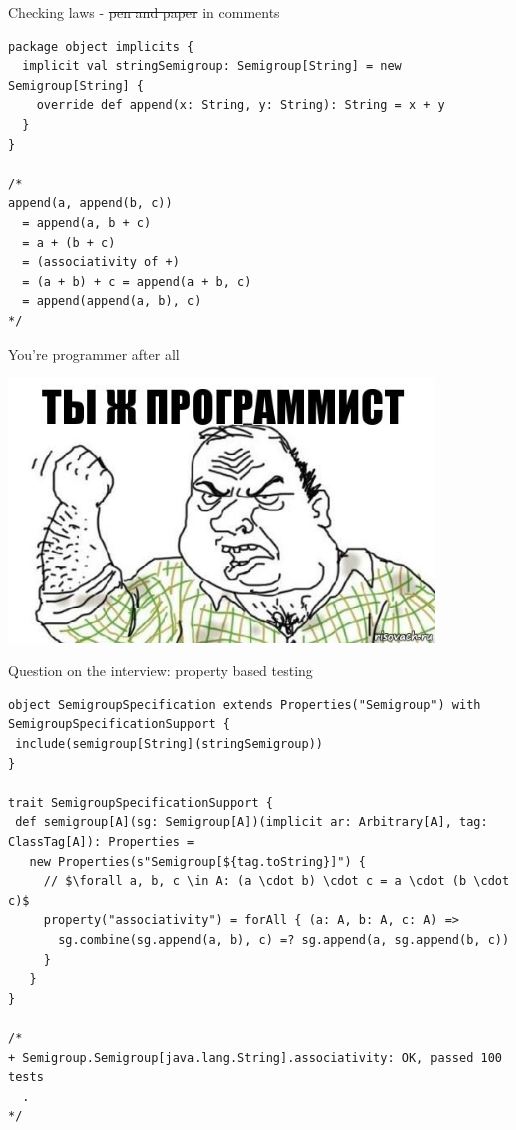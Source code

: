 \documentclass[presentation,aspectratio=169,smaller]{beamer}
\begin{document}
\begin{frame}[label={sec:orgfb023b8},fragile]{Checking laws - \sout{pen and paper} in comments}
 \begin{verbatim}
package object implicits {
  implicit val stringSemigroup: Semigroup[String] = new Semigroup[String] {
    override def append(x: String, y: String): String = x + y
  }
}

/*
append(a, append(b, c))
  = append(a, b + c)
  = a + (b + c)
  = (associativity of +)
  = (a + b) + c = append(a + b, c)
  = append(append(a, b), c)
*/
\end{verbatim}
\end{frame}

\begin{frame}[label={sec:org12870b0}]{You're programmer after all}
\begin{center}
\includegraphics[height=7cm]{images/you-re-programmer.jpg}
\end{center}
\end{frame}

\begin{frame}[label={sec:org9d938ff},fragile]{Question on the interview: property based testing}
 \begin{verbatim}
object SemigroupSpecification extends Properties("Semigroup") with SemigroupSpecificationSupport {
 include(semigroup[String](stringSemigroup))
}

trait SemigroupSpecificationSupport {
 def semigroup[A](sg: Semigroup[A])(implicit ar: Arbitrary[A], tag: ClassTag[A]): Properties =
   new Properties(s"Semigroup[${tag.toString}]") {
     // $\forall a, b, c \in A: (a \cdot b) \cdot c = a \cdot (b \cdot c)$
     property("associativity") = forAll { (a: A, b: A, c: A) =>
       sg.combine(sg.append(a, b), c) =? sg.append(a, sg.append(b, c))
     }
   }
}

/*
+ Semigroup.Semigroup[java.lang.String].associativity: OK, passed 100 tests
  .
*/
\end{verbatim}
\end{frame}
\end{document}

